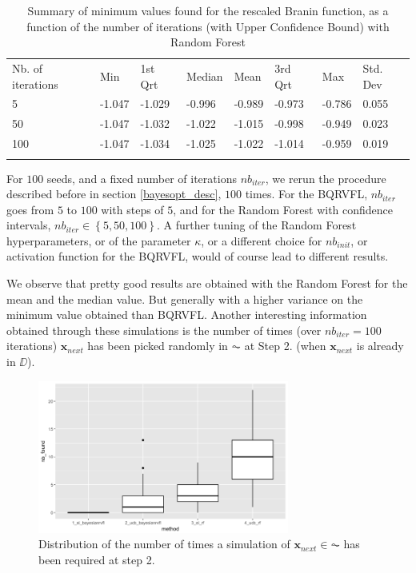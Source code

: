 \begin{table}[!htb]
\begin{center}
\caption{Summary of minimum values found for the rescaled Branin function, as a function of the number of iterations (with Upper Confidence Bound) with Random Forest}
\label{tab:min_values_rf_ucb}       %
\begin{tabular}{llllllll}
\hline\noalign{\smallskip}
Nb. of iterations & Min & 1st Qrt  & Median & Mean  & 3rd Qrt  & Max & Std. Dev \\
\noalign{\smallskip}\hline\noalign{\smallskip}
  5   & -1.047 & -1.029 & -0.996 & -0.989 & -0.973 & -0.786 & 0.055 \\
  50  & -1.047 & -1.032 & -1.022 & -1.015 & -0.998 & -0.949 & 0.023 \\
  100 & -1.047 & -1.034 & -1.025 & -1.022 & -1.014 & -0.959 & 0.019 \\
\noalign{\smallskip}\hline
\end{tabular}
\end{center}
\end{table}

\newpage

For $100$ seeds, and a fixed number of iterations $nb_{iter}$, we rerun the procedure described before in section \ref{bayesopt_desc}, $100$ times. For the BQRVFL, $nb_{iter}$ goes from $5$ to $100$ with steps of $5$, and for the Random Forest with confidence intervals, $nb_{iter} \in \left \lbrace 5, 50, 100 \right \rbrace$. A further tuning of the Random Forest hyperparameters, or of the parameter $\kappa$, or a different choice for $nb_{init}$, or activation function for the BQRVFL, would of course lead to different results. 

We observe that pretty good results are obtained with the Random Forest for the mean and the median value. But generally with a higher variance on the minimum value obtained than BQRVFL. Another interesting information obtained through these simulations is the number of times (over $nb_{iter} = 100$ iterations) $\textbf{x}_{next}$ has been picked randomly in $\AC$ at Step 2. (when $\textbf{x}_{next}$ is already in $\DD$). 

\begin{figure}[!htb]
\centering
\includegraphics[width=8.25cm]{gfx/chapter-bayesianrvfl/nb_is_found.png}
\caption{Distribution of the number of times a simulation of $\textbf{x}_{next} \in \AC$ has been required at step 2.}
\label{nb_is_found_dist}
\end{figure}

